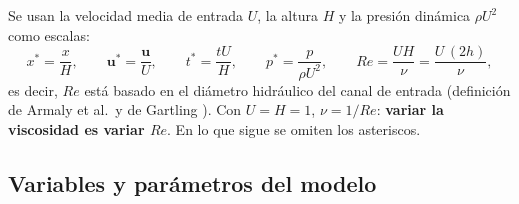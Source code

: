 \documentclass[11pt,letterpaper]{article}
\newcommand{\vu}{\mathbf{u}}
\newcommand{\Rey}{\mathit{Re}}
\begin{document}
Se usan la velocidad media de entrada $U$, la altura $H$ y la presión dinámica $\rho U^2$ como escalas:
\begin{equation}
x^*=\frac{x}{H},\qquad \vu^*=\frac{\vu}{U},\qquad t^*=\frac{tU}{H},\qquad p^*=\frac{p}{\rho U^2},\qquad
\Rey=\frac{UH}{\nu}=\frac{U\,(2h)}{\nu},
\end{equation}
es decir, $\Rey$ está basado en el diámetro hidráulico del canal de entrada (definición de Armaly et al.\ y de
Gartling \cite{armaly,gartling}). Con $U=H=1$, $\nu=1/\Rey$: \textbf{variar la viscosidad es variar $\Rey$}. En lo que
sigue se omiten los asteriscos.

\subsection{Variables y parámetros del modelo}
\end{document}
